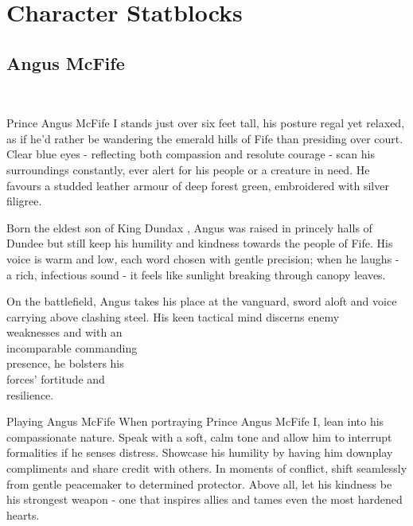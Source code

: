 \onecolumn
\chapter*{Character Statblocks}
\section*{Angus McFife}\label{char:AngusMcFife}%
%
\vspace*{-2.4\fontdimen6\font}\hfill\\\begin{multicols}{2}%
	{\noindent\entryfont Prince Angus McFife I stands just over six feet tall, his posture regal yet relaxed, as if he'd rather be wandering the emerald hills of Fife than presiding over court. Clear blue eyes - reflecting both compassion and resolute courage - scan his surroundings constantly, ever alert for his people or a creature in need. He favours a studded leather armour of deep forest green, embroidered with silver filigree.

	Born the eldest son of King Dundax , Angus was raised in princely halls of Dundee but still keep his humility and kindness towards the people of Fife. His voice is warm and low, each word chosen with gentle precision; when he laughs - a rich, infectious sound - it feels like sunlight breaking through canopy leaves.

	On the battlefield, Angus takes his place at the vanguard, sword aloft and voice carrying above clashing steel. His keen tactical mind discerns enemy\\weaknesses and with an\\incomparable commanding\\presence, he bolsters his\\forces' fortitude and\\resilience.\\\vspace*{-2.5\fontdimen6\font}}
	\begin{DndComment}{Playing Angus McFife}
		When portraying Prince Angus McFife I, lean into his compassionate nature. Speak with a soft, calm tone and allow him to interrupt formalities if he senses distress. Showcase his humility by having him downplay compliments and share credit with others. In moments of conflict, shift seamlessly from gentle peacemaker to determined protector. Above all, let his kindness be his strongest weapon - one that inspires allies and tames even the most hardened hearts.
	\end{DndComment}
\end{multicols}%
%
\clearpage
